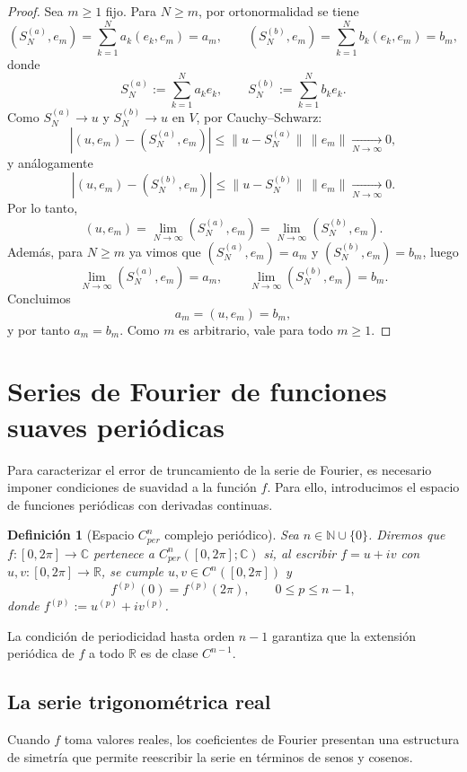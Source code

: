\documentclass[a4paper,11pt]{report}
\newtheorem{definition}[theorem]{Definición}
\begin{document}
\begin{proof}
Sea $m\ge1$ fijo. Para $N\ge m$, por ortonormalidad se tiene
\[
(S_N^{(a)},e_m)=\sum_{k=1}^{N}a_k(e_k,e_m)=a_m,
\qquad
(S_N^{(b)},e_m)=\sum_{k=1}^{N}b_k(e_k,e_m)=b_m,
\]
donde
\[
S_N^{(a)}:=\sum_{k=1}^{N}a_k e_k,
\qquad
S_N^{(b)}:=\sum_{k=1}^{N}b_k e_k.
\]
Como $S_N^{(a)}\to u$ y $S_N^{(b)}\to u$ en $V$, por Cauchy--Schwarz:
\[
|(u,e_m)-(S_N^{(a)},e_m)|\le \|u-S_N^{(a)}\|\,\|e_m\|\xrightarrow[N\to\infty]{}0,
\]
y análogamente
\[
|(u,e_m)-(S_N^{(b)},e_m)|\le \|u-S_N^{(b)}\|\,\|e_m\|\xrightarrow[N\to\infty]{}0.
\]
Por lo tanto,
\[
(u,e_m)=\lim_{N\to\infty}(S_N^{(a)},e_m)=\lim_{N\to\infty}(S_N^{(b)},e_m).
\]
Además, para $N\ge m$ ya vimos que $(S_N^{(a)},e_m)=a_m$ y $(S_N^{(b)},e_m)=b_m$, luego
\[
\lim_{N\to\infty}(S_N^{(a)},e_m)=a_m,
\qquad
\lim_{N\to\infty}(S_N^{(b)},e_m)=b_m.
\]
Concluimos
\[
a_m=(u,e_m)=b_m,
\]
y por tanto $a_m=b_m$. Como $m$ es arbitrario, vale para todo $m\ge1$.
\end{proof}



\section{Series de Fourier de funciones suaves periódicas}\label{sec:series_fourier_suaves}

Para caracterizar el error de truncamiento de la serie de Fourier, es necesario imponer condiciones de suavidad a la función $f$. Para ello, introducimos el espacio de funciones periódicas con derivadas continuas.

\begin{definition}[Espacio $C^n_{per}$ complejo periódico]
Sea $n\in\mathbb{N}\cup\{0\}$. Diremos que $f:[0,2\pi]\to\mathbb{C}$ pertenece a $C^n_{per}([0,2\pi];\mathbb{C})$ si, al escribir $f=u+iv$ con $u,v:[0,2\pi]\to\mathbb{R}$, se cumple $u,v\in C^n([0,2\pi])$ y
\[
f^{(p)}(0)=f^{(p)}(2\pi),\qquad 0\le p\le n-1,
\]
donde $f^{(p)}:=u^{(p)}+iv^{(p)}$.
\end{definition}

La condición de periodicidad hasta orden $n-1$ garantiza que la extensión periódica de $f$ a todo $\mathbb{R}$ es de clase $C^{n-1}$.


\subsection{La serie trigonométrica real}

Cuando $f$ toma valores reales, los coeficientes de Fourier presentan una estructura de simetría que permite reescribir la serie en términos de senos y cosenos.
\end{document}
